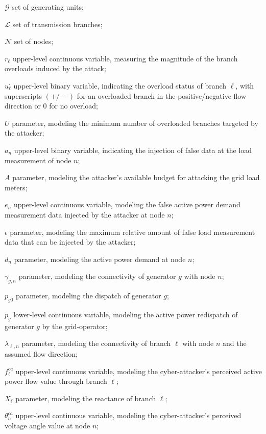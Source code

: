\documentclass{IEEEtran4PSCC}
\newenvironment{mydescription}[1]
  {\begin{list}{}%
   {\renewcommand\makelabel[1]{##1 \hfill}%
   \settowidth\labelwidth{\makelabel{#1}}%
   \setlength\leftmargin{\labelwidth}
   \addtolength\leftmargin{\labelsep}}}
  {\end{list}}
\begin{document}
\begin{mydescription}{$sev$}
	\item[$\mathcal{G}$]{set of generating units;}
	\item[$\mathcal{L}$]{set of transmission branches;}
	\item[$\mathcal{N}$]{set of nodes;}
	\item[$r_{\ell}$]{upper-level continuous variable, measuring the magnitude of the branch overloads induced by the attack;} 
	\item[$u_{\ell}^{\cdot}$]{upper-level binary variable, indicating the overload status of branch $\ell$, with superscripts $(+/-)$ for an overloaded branch in the positive/negative flow direction or $0$ for no overload;}
	\item[$U$]{parameter, modeling the minimum number of overloaded branches targeted by the attacker;}
	\item[$a_{n}$]{upper-level binary variable, indicating the injection of false data at the load measurement of node $n$;}		
	\item[$A$]{parameter, modeling the attacker's available budget for attacking the grid load meters;}
	\item[$e_{n}$]{upper-level continuous variable, modeling the false active power demand measurement data injected by the attacker at node $n$;}	
	\item[$\epsilon$]{parameter, modeling the maximum relative amount of false load measurement data that can be injected by the attacker;}
	\item[$d_n$]{parameter, modeling the active power demand at node $n$;}
	\item[$\gamma_{g,n}$]{parameter, modeling the connectivity of generator $g$ with node $n$;}
	\item[${p}_{g0}$]{parameter, modeling the dispatch of generator $g$;}
	\item[$p_g$]{lower-level continuous variable, modeling the  active power redispatch of generator $g$ by the grid-operator;}
	\item[$\lambda_{\ell,n}$]{parameter, modeling the connectivity of branch $\ell$ with node $n$ and the assumed flow direction;}
	\item[$f_{\ell}^{ca}$]{upper-level continuous variable, modeling the cyber-attacker's perceived active power flow  value through branch $\ell$;}
	\item[$X_{\ell}$]{parameter, modeling the reactance of branch $\ell$;}
	\item[$\theta_n^{ca}$]{upper-level continuous variable, modeling the cyber-attacker's perceived voltage angle value at node $n$;}

\end{mydescription}
\end{document}
